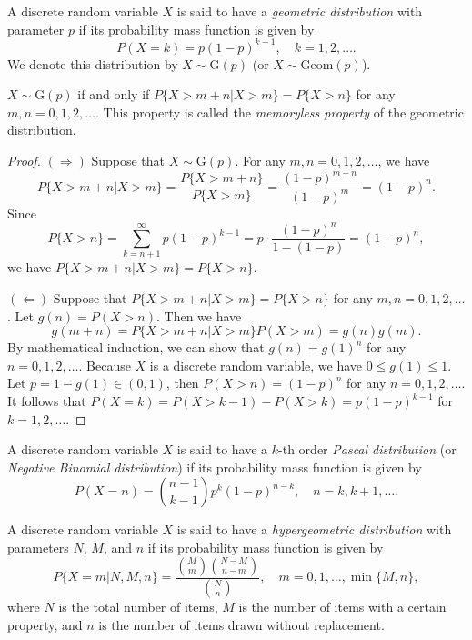 \begin{definition}
  A discrete random variable \(X\) is said to have a \emph{geometric distribution} with parameter \(p\) if its probability mass function is given by
  \[
    P(X = k) = p (1 - p)^{k - 1}, \quad k = 1, 2, \dots.
  \]
  We denote this distribution by \(X \sim \mathrm{G}(p)\) (or \(X \sim \mathrm{Geom}(p)\)).  
\end{definition}

\begin{proposition}
  \(X \sim \mathrm{G}(p)\) if and only if \(P\{X > m + n | X > m\} = P\{X > n\}\) for any \(m, n = 0, 1, 2, \dots\). This property is called the \emph{memoryless property} of the geometric distribution.
\end{proposition}

\begin{proof}
  \((\Rightarrow)\) Suppose that \(X \sim \mathrm{G}(p)\). For any \(m, n = 0, 1, 2, \dots\), we have
  \[
    P\{X > m + n | X > m\} = \frac{P\{X > m + n\}}{P\{X > m\}} = \frac{(1 - p)^{m + n}}{(1 - p)^m} = (1 - p)^n.
  \]
  Since
  \[
    P\{X > n\} = \sum_{k = n + 1}^\infty p (1 - p)^{k - 1} = p \cdot \frac{(1 - p)^n}{1 - (1 - p)} = (1 - p)^n,
  \]
  we have \(P\{X > m + n | X > m\} = P\{X > n\}\).

  \((\Leftarrow)\) Suppose that \(P\{X > m + n | X > m\} = P\{X > n\}\) for any \(m, n = 0, 1, 2, \dots\). Let \(g(n) = P(X > n)\). Then we have
  \[
    g(m + n) = P\{X > m + n | X > m\} P(X > m) = g(n) g(m).
  \]
  By mathematical induction, we can show that \(g(n) = g(1)^n\) for any \(n = 0, 1, 2, \dots\). Because \(X\) is a discrete random variable, we have \(0 \leq g(1) \leq 1\). Let \(p = 1 - g(1) \in (0, 1)\), then \(P(X > n) = (1 - p)^n\) for any \(n = 0, 1, 2, \dots\). It follows that \(P(X = k) = P(X > k - 1) - P(X > k) = p (1 - p)^{k - 1}\) for \(k = 1, 2, \dots.\)
\end{proof}

\begin{definition}
  A discrete random variable \(X\) is said to have a \(k\)-th order \emph{Pascal distribution} (or \emph{Negative Binomial distribution}) if its probability mass function is given by
  \[
    P(X = n) = \binom{n - 1}{k - 1} p^k (1 - p)^{n - k}, \quad n = k, k + 1, \dots.
  \]
\end{definition}

\begin{definition}
  A discrete random variable \(X\) is said to have a \emph{hypergeometric distribution} with parameters \(N\), \(M\), and \(n\) if its probability mass function is given by
  \[
    P\{X = m \vert N, M, n\} = \frac{\binom{M}{m} \binom{N - M}{n - m}}{\binom{N}{n}}, \quad m = 0, 1, \dots, \min\{M, n\},
  \]
  where \(N\) is the total number of items, \(M\) is the number of items with a certain property, and \(n\) is the number of items drawn without replacement.
\end{definition}

